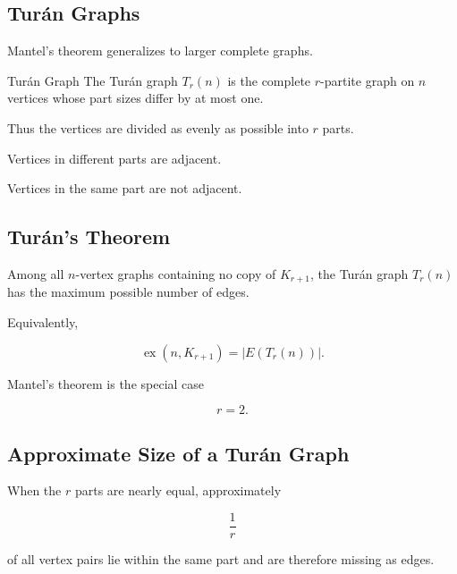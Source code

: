 \subsection{Tur\'an Graphs}
\label{subsec:turan-graphs}

Mantel's theorem generalizes to larger complete graphs.

\begin{definitionbox}{Tur\'an Graph}
The Tur\'an graph \(T_r(n)\) is the complete \(r\)-partite graph on
\(n\) vertices whose part sizes differ by at most one.
\end{definitionbox}

Thus the vertices are divided as evenly as possible into \(r\) parts.

Vertices in different parts are adjacent.

Vertices in the same part are not adjacent.

\subsection{Tur\'an's Theorem}
\label{subsec:turans-theorem}

\begin{theorem}
Among all \(n\)-vertex graphs containing no copy of \(K_{r+1}\), the
Tur\'an graph \(T_r(n)\) has the maximum possible number of edges.

Equivalently,

\[
\boxed{
\operatorname{ex}(n,K_{r+1})
=
|E(T_r(n))|.
}
\]
\end{theorem}

Mantel's theorem is the special case

\[
r=2.
\]

\subsection{Approximate Size of a Tur\'an Graph}
\label{subsec:turan-graph-size}

When the \(r\) parts are nearly equal, approximately

\[
\frac1r
\]

of all vertex pairs lie within the same part and are therefore missing
as edges.

